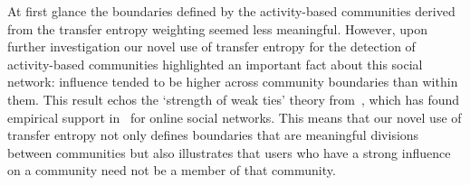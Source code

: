 

At first glance the boundaries defined by the activity-based communities derived from the transfer entropy weighting seemed less meaningful. However, upon further investigation our novel use of transfer entropy for the detection of activity-based communities highlighted an important fact about this social network: influence tended to be higher across community boundaries than within them. This result echos the `strength of weak ties' theory from~\cite{granovetter1973strength}, which has found empirical support in~\cite{grabowicz2012social} for online social networks. This means that our novel use of transfer entropy not only defines boundaries that are meaningful divisions between communities but also illustrates that users who have a strong influence on a community need not be a member of that community. 


